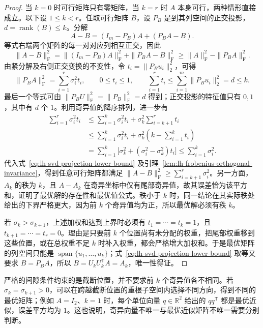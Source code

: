 \begin{proof}
当 $k=0$ 时可行矩阵只有零矩阵，当 $k=r$ 时 $A$ 本身可行，两种情形直接成立。以下设 $1\leq k<r$。任取可行矩阵 $B$，设 $P_B$ 是到其列空间的正交投影，$d=\operatorname{rank}(B)\leq k$。分解
\[
A-B=(I_m-P_B)A+(P_BA-B).
\]
等式右端两个矩阵的每一对对应列相互正交，因此
\begin{equation}
\|A-B\|_{\mathrm F}^2
=\|(I_m-P_B)A\|_{\mathrm F}^2+\|P_BA-B\|_{\mathrm F}^2
\geq\|A\|_{\mathrm F}^2-\|P_BA\|_{\mathrm F}^2.
\label{eq:lh-svd-projection-lower-bound}
\end{equation}
由紧分解及右侧正交变换的不变性，令 $t_i=\|P_Bu_i\|_2^2$，可得
\[
\|P_BA\|_{\mathrm F}^2=\sum_{i=1}^r\sigma_i^2t_i,\qquad
0\leq t_i\leq1,\qquad
\sum_{i=1}^r t_i\leq\sum_{i=1}^m\|P_Bu_i\|_2^2=d\leq k.
\]
最后一个等式可由 $\|P_BU\|_{\mathrm F}^2=\|P_B\|_{\mathrm F}^2=d$ 得到；正交投影的特征值只有 $0,1$，其中有 $d$ 个 $1$。利用奇异值的降序排列，进一步有
\begin{align*}
\sum_{i=1}^r\sigma_i^2t_i
&\leq\sum_{i=1}^k\sigma_i^2t_i+
\sigma_k^2\sum_{i=k+1}^r t_i\\
&\leq\sum_{i=1}^k\sigma_i^2t_i+
\sigma_k^2\left(k-\sum_{i=1}^k t_i\right)\\
&=\sum_{i=1}^k\bigl[\sigma_k^2+(\sigma_i^2-\sigma_k^2)t_i\bigr]
\leq\sum_{i=1}^k\sigma_i^2.
\end{align*}
代入式~\eqref{eq:lh-svd-projection-lower-bound} 及引理~\ref{lem:lh-frobenius-orthogonal-invariance}，得到任意可行矩阵都满足 $\|A-B\|_{\mathrm F}^2\geq\sum_{i=k+1}^r\sigma_i^2$。另一方面，$A_k$ 的秩为 $k$，且 $A-A_k$ 在奇异坐标中仅有尾部奇异值，故其误差恰为该平方和，证明了最优解的存在性和最优值公式。秩小于 $k$ 时，同一结论在其实际秩处给出的下界严格更大，因为前 $k$ 个奇异值均为正，所以最优解必须有秩 $k$。

若 $\sigma_k>\sigma_{k+1}$，上述加权和达到上界时必须有 $t_1=\cdots=t_k=1$，且 $t_{k+1}=\cdots=t_r=0$。理由是只要前 $k$ 个位置尚有未分配的权重，把尾部权重移到这些位置，或在总权重不足 $k$ 时补入权重，都会严格增大加权和。于是最优矩阵的列空间只能是 $\operatorname{span}\{u_1,\ldots,u_k\}$；式~\eqref{eq:lh-svd-projection-lower-bound} 取等又要求 $B=P_BA$，所以 $B=U_kU_k^{\mathsf T}A=A_k$，唯一性得证。
\end{proof}

严格的间隙条件约束的是截断位置，并不要求前 $k$ 个奇异值各不相同。若 $\sigma_k=\sigma_{k+1}>0$，可以在跨越截断位置的重根子空间内选择不同方向，得到不同的最优矩阵；例如 $A=I_2$、$k=1$ 时，每个单位向量 $q\in\mathbb R^2$ 给出的 $qq^{\mathsf T}$ 都是最优近似，误差平方均为 $1$。这也说明，奇异向量不唯一与最优近似矩阵不唯一需要分别判断。

